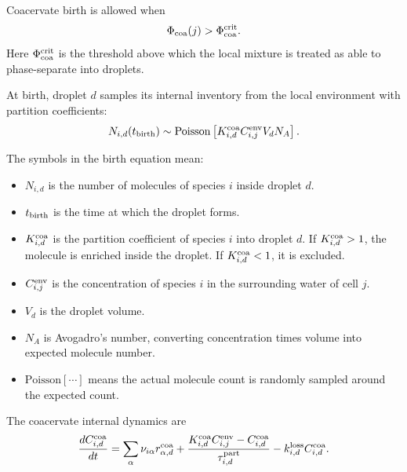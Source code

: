 \documentclass[11pt]{article}
\begin{document}
Coacervate birth is allowed when
\begin{equation}
\Phi_{\rm coa}(j)>\Phi_{\rm coa}^{\rm crit}.
\end{equation}
Here $\Phi_{\rm coa}^{\rm crit}$ is the threshold above which the local mixture
is treated as able to phase-separate into droplets.

At birth, droplet $d$ samples its internal inventory from the local environment
with partition coefficients:
\begin{equation}
N_{i,d}(t_{\rm birth})
\sim
\mathrm{Poisson}
\left[
K_{i,d}^{\rm coa}
C_{i,j}^{\rm env}
V_d
N_A
\right].
\end{equation}

The symbols in the birth equation mean:
\begin{itemize}
  \item $N_{i,d}$ is the number of molecules of species $i$ inside droplet $d$.
  \item $t_{\rm birth}$ is the time at which the droplet forms.
  \item $K_{i,d}^{\rm coa}$ is the partition coefficient of species $i$ into
  droplet $d$. If $K_{i,d}^{\rm coa}>1$, the molecule is enriched inside the
  droplet. If $K_{i,d}^{\rm coa}<1$, it is excluded.
  \item $C_{i,j}^{\rm env}$ is the concentration of species $i$ in the
  surrounding water of cell $j$.
  \item $V_d$ is the droplet volume.
  \item $N_A$ is Avogadro's number, converting concentration times volume into
  expected molecule number.
  \item $\mathrm{Poisson}[\cdots]$ means the actual molecule count is randomly
  sampled around the expected count.
\end{itemize}

The coacervate internal dynamics are
\begin{equation}
\frac{dC_{i,d}^{\rm coa}}{dt}
=
\sum_\alpha \nu_{i\alpha} r_{\alpha,d}^{\rm coa}
+
\frac{
K_{i,d}^{\rm coa}C_{i,j}^{\rm env}
-
C_{i,d}^{\rm coa}
}{\tau_{i,d}^{\rm part}}
-
k_{i,d}^{\rm loss}C_{i,d}^{\rm coa}.
\end{equation}
\end{document}
